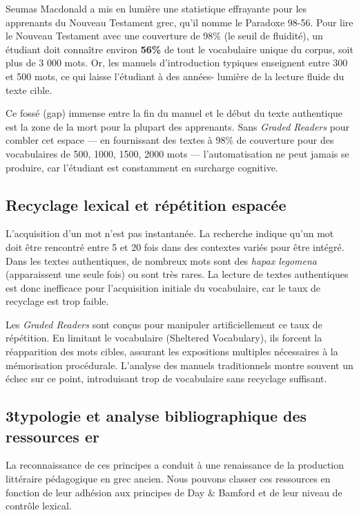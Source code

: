 Seumas Macdonald a mis en lumière une statistique effrayante pour les apprenants du Nouveau
Testament grec, qu'il nomme le \og Paradoxe 98-56\fg{}.\cite{III-3-2-ref23} Pour lire le Nouveau
Testament avec une couverture de 98\% (le seuil de fluidité), un étudiant doit connaître environ
\textbf{56\%} de tout le vocabulaire unique du corpus, soit plus de 3 000 mots. Or, les manuels
d'introduction typiques enseignent entre 300 et 500 mots, ce qui laisse l'étudiant à des années-
lumière de la lecture fluide du texte cible.

Ce fossé (gap) immense entre la fin du manuel et le début du texte authentique est la zone de la
mort pour la plupart des apprenants. Sans \textit{Graded Readers} pour combler cet espace — en
fournissant des textes à 98\% de couverture pour des vocabulaires de 500, 1000, 1500, 2000 mots —
l'automatisation ne peut jamais se produire, car l'étudiant est constamment en surcharge cognitive.



\subsection{Recyclage lexical et répétition espacée}

L'acquisition d'un mot n'est pas instantanée. La recherche indique qu'un mot doit être rencontré
entre 5 et 20 fois dans des contextes variés pour être intégré.\cite{III-3-2-ref24} Dans les textes
authentiques, de nombreux mots sont des \textit{hapax legomena} (apparaissent une seule fois) ou
sont très rares. La lecture de textes authentiques est donc inefficace pour l'acquisition initiale
du vocabulaire, car le taux de recyclage est trop faible.

Les \textit{Graded Readers} sont conçus pour manipuler artificiellement ce taux de répétition. En
limitant le vocabulaire (Sheltered Vocabulary), ils forcent la réapparition des mots cibles,
assurant les expositions multiples nécessaires à la mémorisation procédurale.\cite{III-3-2-ref25}
L'analyse des manuels traditionnels montre souvent un échec sur ce point, introduisant trop de
vocabulaire sans recyclage suffisant.\cite{III-3-2-ref26}



\subsection{3\. typologie et analyse bibliographique des ressources er}

La reconnaissance de ces principes a conduit à une renaissance de la production littéraire
pédagogique en grec ancien. Nous pouvons classer ces ressources en fonction de leur adhésion aux
principes de Day \& Bamford et de leur niveau de contrôle lexical.



